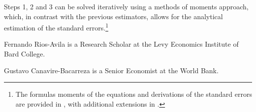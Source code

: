\documentclass[bib]{statapress}
\begin{document}
Steps 1, 2 and 3 can be solved iteratively using a methods of moments
approach, which, in contrast with the previous estimators, allows for
the analytical estimation of the standard errors.\footnote{The formulas
  moments of the equations and derivations of the standard errors are
  provided in \citet{mss2019}, with additional extensions in
  \citet{riosavila2024}.}

\clearpage





\begin{aboutauthors}

Fernando Rios-Avila is a Research Scholar at the Levy Economics
Institute of Bard College.

Gustavo Canavire-Bacarreza is a Senior Economist at the World Bank.

\end{aboutauthors}
\end{document}

